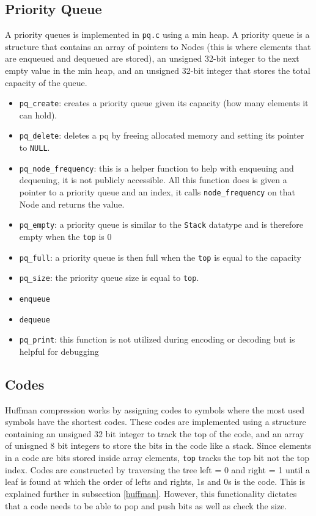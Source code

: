 \documentclass[12pt]{article}
\def\code#1{\texttt{#1}} %
\begin{document}
\subsection{Priority Queue}

A priority queues is implemented in \code{pq.c} using a min heap. A priority queue
is a structure that contains an array of pointers to Nodes (this is where elements
that are enqueued and dequeued are stored), an unsigned 32-bit integer to the next
empty value in the min heap, and an unsigned 32-bit integer that stores the total
capacity of the queue.

\begin{itemize}
	\item{\code{pq\_create}: creates a priority queue given its capacity (how many elements it can
		hold).}
	\item{\code{pq\_delete}: deletes a pq by freeing allocated memory and setting its 
		pointer to \code{NULL}.}
	\item{\code{pq\_node\_frequency}: this is a helper function to help with enqueuing
			and dequeuing, it is not publicly accessible. All this function does is given a pointer
			to a priority queue and an index, it calls \code{node\_frequency} on that Node and returns
		the value.}
	\item{\code{pq\_empty}: a priority queue is similar to the \code{Stack} datatype and is
		therefore empty when the \code{top} is 0}
	\item{\code{pq\_full}: a priority queue is then full when the \code{top} is equal to the capacity}
	\item{\code{pq\_size}: the priority queue size is equal to \code{top}.}
	\item{\code{enqueue} }
	\item{\code{dequeue} }
	\item{\code{pq\_print}: this function is not utilized during encoding or decoding
		but is helpful for debugging}
\end{itemize}

\subsection{Codes}

Huffman compression works by assigning codes to symbols where the most used symbols have the
shortest codes. These codes are implemented using a structure containing an unsigned 32 bit
integer to track the top of the code, and an array of unisgned 8 bit integers to store the
bits in the code like a stack. Since elements in a code are bits stored inside array elements, \code{top}
tracks the top bit not the top index. Codes are constructed by traversing the tree left = 0 and right = 1 until
a leaf is found at which the order of lefts and rights, 1s and 0s is the code. This is explained
further in subsection \vref{huffman}. However, this functionality dictates that a code
needs to be able to pop and push bits as well as check the size.
\end{document}
